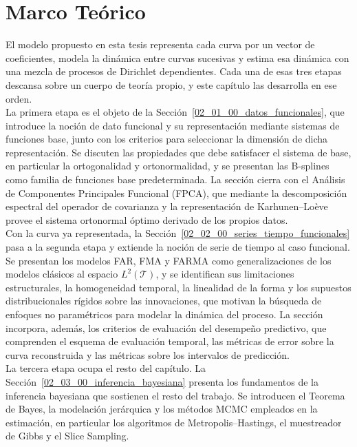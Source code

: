 \chapter{Marco Teórico}
\label{02_00_00_fundamentos_teoricos_metodologicos}
El modelo propuesto en esta tesis representa cada curva por un vector de coeficientes, modela la dinámica entre curvas sucesivas y estima esa dinámica con una mezcla de procesos de Dirichlet dependientes. Cada una de esas tres etapas descansa sobre un cuerpo de teoría propio, y este capítulo las desarrolla en ese orden.\\

La primera etapa es el objeto de la Sección~\ref{02_01_00_datos_funcionales}, que introduce la noción de dato funcional y su representación mediante sistemas de funciones base, junto con los criterios para seleccionar la dimensión de dicha representación. Se discuten las propiedades que debe satisfacer el sistema de base, en particular la ortogonalidad y ortonormalidad, y se presentan las B-splines como familia de funciones base predeterminada. La sección cierra con el Análisis de Componentes Principales Funcional (FPCA), que mediante la descomposición espectral del operador de covarianza y la representación de Karhunen--Loève provee el sistema ortonormal óptimo derivado de los propios datos.\\

Con la curva ya representada, la Sección~\ref{02_02_00_series_tiempo_funcionales} pasa a la segunda etapa y extiende la noción de serie de tiempo al caso funcional. Se presentan los modelos FAR, FMA y FARMA como generalizaciones de los modelos clásicos al espacio $L^2(\mathcal{T})$, y se identifican sus limitaciones estructurales, la homogeneidad temporal, la linealidad de la forma y los supuestos distribucionales rígidos sobre las innovaciones, que motivan la búsqueda de enfoques no paramétricos para modelar la dinámica del proceso. La sección incorpora, además, los criterios de evaluación del desempeño predictivo, que comprenden el esquema de evaluación temporal, las métricas de error sobre la curva reconstruida y las métricas sobre los intervalos de predicción.\\

La tercera etapa ocupa el resto del capítulo. La Sección~\ref{02_03_00_inferencia_bayesiana} presenta los fundamentos de la inferencia bayesiana que sostienen el resto del trabajo. Se introducen el Teorema de Bayes, la modelación jerárquica y los métodos MCMC empleados en la estimación, en particular los algoritmos de Metropolis--Hastings, el muestreador de Gibbs y el Slice Sampling.\\

